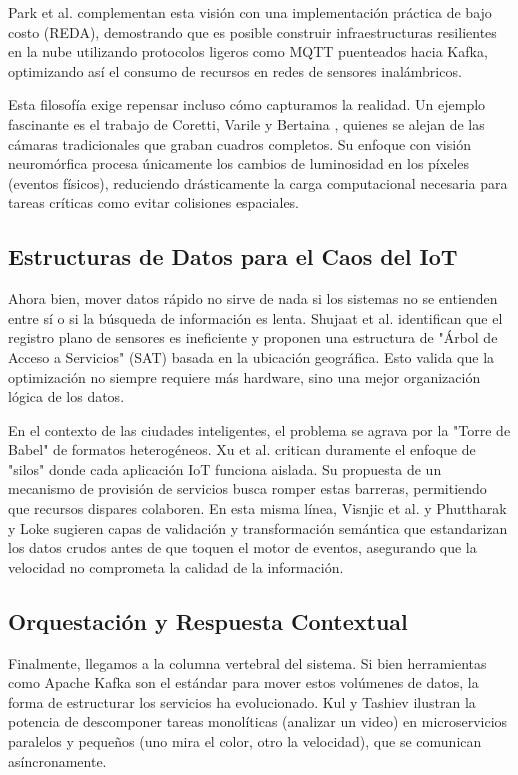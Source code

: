 Park et al. \cite{park2021cloud} complementan esta visión con una implementación práctica de bajo costo (REDA), demostrando que es posible construir infraestructuras resilientes en la nube utilizando protocolos ligeros como MQTT puenteados hacia Kafka, optimizando así el consumo de recursos en redes de sensores inalámbricos.

Esta filosofía exige repensar incluso cómo capturamos la realidad. Un ejemplo fascinante es el trabajo de Coretti, Varile y Bertaina \cite{coretti2025neuromorphic}, quienes se alejan de las cámaras tradicionales que graban cuadros completos. Su enfoque con visión neuromórfica procesa únicamente los cambios de luminosidad en los píxeles (eventos físicos), reduciendo drásticamente la carga computacional necesaria para tareas críticas como evitar colisiones espaciales.

\subsection{Estructuras de Datos para el Caos del IoT}
Ahora bien, mover datos rápido no sirve de nada si los sistemas no se entienden entre sí o si la búsqueda de información es lenta. Shujaat et al. \cite{shujaat2021improvements} identifican que el registro plano de sensores es ineficiente y proponen una estructura de "Árbol de Acceso a Servicios" (SAT) basada en la ubicación geográfica. Esto valida que la optimización no siempre requiere más hardware, sino una mejor organización lógica de los datos.

En el contexto de las ciudades inteligentes, el problema se agrava por la "Torre de Babel" de formatos heterogéneos. Xu et al. \cite{xu2016provisioning} critican duramente el enfoque de "silos" donde cada aplicación IoT funciona aislada. Su propuesta de un mecanismo de provisión de servicios busca romper estas barreras, permitiendo que recursos dispares colaboren. En esta misma línea, Visnjic et al. \cite{visnjic2021decision} y Phuttharak y Loke \cite{phuttharak2023smartcity} sugieren capas de validación y transformación semántica que estandarizan los datos crudos antes de que toquen el motor de eventos, asegurando que la velocidad no comprometa la calidad de la información.

\subsection{Orquestación y Respuesta Contextual}
Finalmente, llegamos a la columna vertebral del sistema. Si bien herramientas como Apache Kafka son el estándar para mover estos volúmenes de datos, la forma de estructurar los servicios ha evolucionado. Kul y Tashiev \cite{kul2021microservices} ilustran la potencia de descomponer tareas monolíticas (analizar un video) en microservicios paralelos y pequeños (uno mira el color, otro la velocidad), que se comunican asíncronamente.


